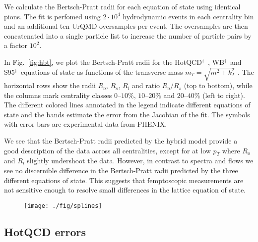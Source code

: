\documentclass[aps,prc,reprint,amsmath,nofootinbib,superscriptaddress]{revtex4-1}
\newcommand{\hotqcd}{HotQCD$^\dagger$~}
\newcommand{\wb}{WB$^\dagger$~}
\newcommand{\spv}{S95$^\dagger$~}
\begin{document}
We calculate the Bertsch-Pratt radii for each equation of state using identical pions. The fit is perfomed using $2\cdot10^4$ hydrodynamic events in each centrality bin and an additional ten UrQMD oversamples per event. 
The oversamples are then concatenated into a single particle list to increase the number of particle pairs by a factor $10^2$.

In Fig.~\ref{fig:hbt}, we plot the Bertsch-Pratt radii for the \hotqcd, \wb and \spv equations of state as functions of the transverse mass $m_T = \sqrt{m^2 + k_T^2}$ . The horizontal rows show the radii $R_o$, $R_s$, $R_l$ and ratio $R_o/R_s$ (top to bottom), while the columns 
mark centrality classes $0$--$10\%$, $10$--$20\%$ and $20$--$40\%$ (left to right). The different colored lines annotated in the legend indicate different equations of state and the bands estimate the error from the Jacobian 
of the fit. The symbols with error bars are experimental data from PHENIX.

We see that the Bertsch-Pratt radii predicted by the hybrid model provide a good description of the data across all centralities, except for at low $p_T$ where $R_o$ and $R_l$ slightly undershoot the data. However, in contrast to
spectra and flows we see no discernible difference in the Bertsch-Pratt radii predicted by the three different equations of state. This suggests that femptoscopic measurements are not sensitive enough to resolve small differences
in the lattice equation of state.

\begin{figure}[b]
  \texttt{[image: ./fig/splines]}
  \caption{
    \label{fig:splines}
  }
\end{figure}

\subsection{HotQCD errors}
\label{errors}
\end{document}

